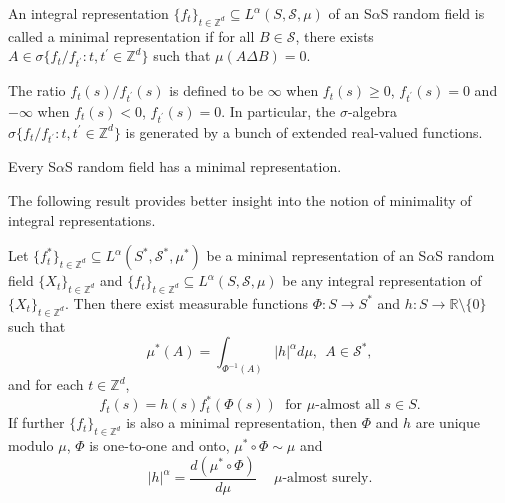 \documentclass[12pt]{amsart}
\begin{document}
\begin{defn} An integral representation $\{f_t\}_{t \in \mathbb{Z}^d} \subseteq L^\alpha(S, \mathcal{S}, \mu)$ of an S$\alpha$S random field is called a minimal representation if for all $B \in \mathcal{S}$, there exists $A \in \sigma\big\{f_t/f_{t^\prime}: t, t^\prime \in {\mathbb{Z}^d}\big\}$ such that $\mu(A \Delta B)=0$.
\end{defn}

The ratio $f_t(s)/f_{t^\prime}(s)$ is defined to be $\infty$ when $f_t(s) \geq 0$, $f_{t^\prime}(s)=0$ and $-\infty$ when $f_t(s)<0$, $f_{t^\prime}(s)=0$. In particular, the $\sigma$-algebra $\sigma\big\{f_t/f_{t^\prime}: t, t^\prime \in {\mathbb{Z}^d}\big\}$ is generated by a bunch of extended real-valued functions.

\begin{thm} \label{thm_existence_minimal_repn} Every S$\alpha$S random field has a minimal representation.
\end{thm}

The following result provides better insight into the notion of minimality of integral representations.

\begin{thm} \label{thm_rigidity_repn} Let $\{f^\ast_t\}_{t \in \mathbb{Z}^d} \subseteq L^\alpha(S^\ast, \mathcal{S}^\ast, \mu^\ast)$ be a minimal representation of an S$\alpha$S random field ${\{X_t\}_{t \in \mathbb{Z}^d}}$ and $\{f_t\}_{t \in \mathbb{Z}^d} \subseteq L^\alpha(S, \mathcal{S}, \mu)$ be any integral representation of ${\{X_t\}_{t \in \mathbb{Z}^d}}$. Then there exist measurable functions $\Phi: S \to S^\ast$ and $h: S \to \mathbb{R}\setminus \{0\}$ such that
\begin{equation}
\mu^\ast(A)=\int_{\Phi^{-1}(A)}|h|^\alpha d\mu, \;\,  A \in  \mathcal{S}^\ast, \label{reln_between_mu_h_muast}
\end{equation}
and for each $t \in {\mathbb{Z}^d}$,
\begin{equation}
f_t(s)=h(s) f_t^\ast(\Phi(s)) \;\mbox{ for $\mu$-almost all } s \in S. \label{reln_between_f_and_fast}
\end{equation}
If further $\{f_t\}_{t \in \mathbb{Z}^d}$ is also a minimal representation, then $\Phi$ and $h$ are unique modulo $\mu$, $\Phi$ is one-to-one and onto, $\mu^\ast \circ \Phi \sim \mu$ and
\begin{equation}
|h|^\alpha=\frac{d (\mu^\ast \circ \Phi)}{d\mu}\;\;\mbox{ $\mu$-almost surely.}\label{reln_between_mu_h_muast_f_minimal}
\end{equation}
\end{thm}
\end{document}
